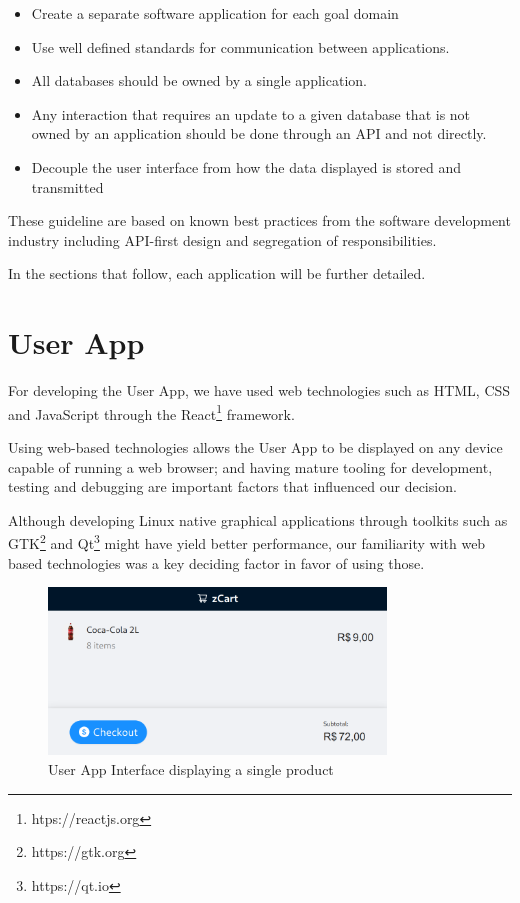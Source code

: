 \documentclass[openright]{normas-utf-tex} %
\begin{document}
\begin{itemize}
    \item Create a separate software application for each goal domain
    \item Use well defined standards for communication between applications.
    \item All databases should be owned by a single application. 
    \item Any interaction that requires an update to a given database that is
        not owned by an application should be done through an API and not
        directly.
    \item Decouple the user interface from how the data displayed is stored and transmitted
\end{itemize}

These guideline are based on known best practices from the software 
development industry including API-first design and segregation of
responsibilities. \cite{Sam2021,Kong2022}

In the sections that follow, each application will be further detailed.

\section{User App}

For developing the User App, we have used web technologies such 
as HTML, CSS \cite{Duckett2011} and JavaScript \cite{Flanagan2020} through the 
React\footnote{htps://reactjs.org} framework. 

Using web-based technologies allows the User App to be displayed on any 
device capable of running a web browser; and having mature tooling for 
development, testing and debugging are important factors that influenced 
our decision.

Although developing Linux native graphical applications through toolkits such
as GTK\footnote{https://gtk.org} and Qt\footnote{https://qt.io} might have
yield better performance, our familiarity with web based technologies was a
key deciding factor in favor of using those.

\begin{figure}[H]
	\centering
	\includegraphics[width=0.8\textwidth]{./images/ui.png}
	\caption[User App Interface display a single product]{User App Interface displaying a single product}
	\label{fig:userapp}
\end{figure}
\end{document}
